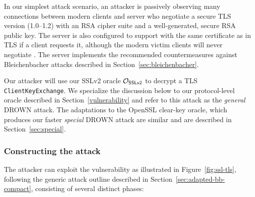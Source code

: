 In our simplest attack scenario, an attacker is passively observing many connections between modern clients and server who negotiate a secure TLS version (1.0--1.2) with an RSA cipher suite and a well-generated, secure RSA public key.   The server is also configured to support \ssltwo with the same certificate as in TLS if a client requests it, although the modern victim clients will never negotiate \ssltwo.  The server implements the recommended countermeasures against Bleichenbacher attacks described in Section~\ref{sec:bleichenbacher}.



Our attacker will use our SSLv2 oracle $\mathcal{O}_\textsf{SSLv2}$ to decrypt a TLS \texttt{ClientKeyExchange}.  We specialize the discussion below to our protocol-level oracle described in Section~\ref{vulnerability} and refer to this attack as the \emph{general} DROWN attack.  The adaptations to the OpenSSL clear-key oracle, which produces our faster \emph{special} DROWN attack are similar and are described in Section~\ref{sec:special}.
\fi

\subsubsection{Constructing the attack}

The attacker can exploit the \ssltwo vulnerability
\ifext as illustrated in Figure~\ref{fig:ssl-tls}, \fi
following the generic attack outline described in Section~\ref{sec:adapted-bb-compact},
consisting of several distinct phases:

